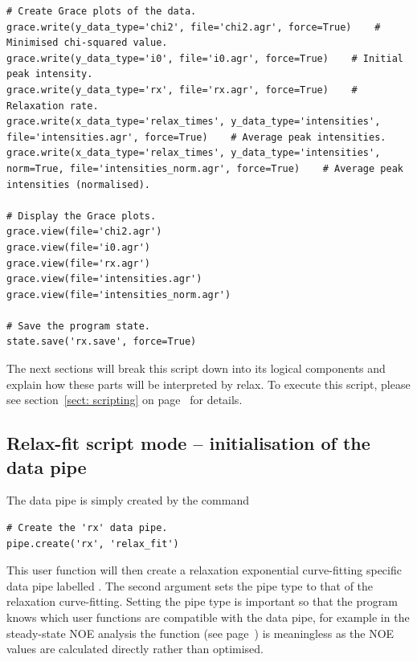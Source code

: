 \begin{lstlisting}
# Create Grace plots of the data.
grace.write(y_data_type='chi2', file='chi2.agr', force=True)    # Minimised chi-squared value.
grace.write(y_data_type='i0', file='i0.agr', force=True)    # Initial peak intensity.
grace.write(y_data_type='rx', file='rx.agr', force=True)    # Relaxation rate.
grace.write(x_data_type='relax_times', y_data_type='intensities', file='intensities.agr', force=True)    # Average peak intensities.
grace.write(x_data_type='relax_times', y_data_type='intensities', norm=True, file='intensities_norm.agr', force=True)    # Average peak intensities (normalised).

# Display the Grace plots.
grace.view(file='chi2.agr')
grace.view(file='i0.agr')
grace.view(file='rx.agr')
grace.view(file='intensities.agr')
grace.view(file='intensities_norm.agr')

# Save the program state.
state.save('rx.save', force=True)
\end{lstlisting}

The next sections will break this script down into its logical components and explain how these parts will be interpreted by relax.  To execute this script, please see section~\ref{sect: scripting} on page~\pageref{sect: scripting} for details.



\subsection{Relax-fit script mode -- initialisation of the data pipe} \label{Rx initialisation}

The data pipe is simply created by the command

\begin{lstlisting}[firstnumber=3]
# Create the 'rx' data pipe.
pipe.create('rx', 'relax_fit')
\end{lstlisting}

This user function will then create a relaxation exponential curve-fitting specific data pipe labelled .  The second argument sets the pipe type to that of the relaxation curve-fitting.  Setting the pipe type is important so that the program knows which user functions are compatible with the data pipe, for example in the steady-state NOE analysis the function  (see page~\pageref{uf: minimise}) is meaningless as the NOE values are calculated directly rather than optimised.



